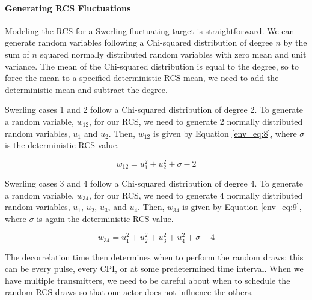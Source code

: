 \paragraph{Generating RCS Fluctuations}
Modeling the RCS for a Swerling fluctuating target is straightforward. We can generate random variables following a Chi-squared distribution of degree $n$ by the sum of $n$ squared normally distributed random variables with zero mean and unit variance. The mean of the Chi-squared distribution is equal to the degree, so to force the mean to a specified deterministic RCS mean, we need to add the deterministic mean and subtract the degree.

Swerling cases 1 and 2 follow a Chi-squared distribution of degree 2. To generate a random variable, $w_{12}$, for our RCS, we need to generate 2 normally distributed random variables, $u_1$ and $u_2$. Then, $w_{12}$ is given by Equation \ref{env_eq:8}, where $\sigma$ is the deterministic RCS value.

\begin{equation}
  \label{env_eq:8}
w_{12} = u_1^2 + u_2^2 + \sigma - 2
  \end{equation}
\renewcommand{\baselinestretch}{2} \small\normalsize

Swerling cases 3 and 4 follow a Chi-squared distribution of degree 4. To generate a random variable, $w_{34}$, for our RCS, we need to generate 4 normally distributed random variables, $u_1$, $u_2$, $u_3$, and $u_4$. Then, $w_{34}$ is given by Equation \ref{env_eq:9}, where $\sigma$ is again the deterministic RCS value.

\begin{equation}
  \label{env_eq:9}
w_{34} = u_1^2 + u_2^2 + u_3^2 + u_4^2 + \sigma - 4
  \end{equation}
  \renewcommand{\baselinestretch}{2} \small\normalsize
  
The decorrelation time then determines when to perform the random draws; this can be every pulse, every CPI, or at some predetermined time interval. When we have multiple transmitters, we need to be careful about when to schedule the random RCS draws so that one actor does not influence the others.  